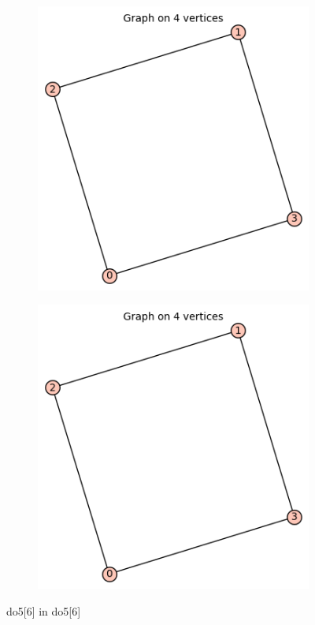 \documentclass[12pt, a4paper]{article}
\begin{document}
\begin{center}
\begin{figure}
\centering
\begin{subfigure}{0.5\textwidth}
  \centering
  \includegraphics[width=0.6\linewidth]{do5[6]}
\end{subfigure}%
\begin{subfigure}{0.5\textwidth}
  \centering
  \includegraphics[width=0.6\linewidth]{do5[6]}
\end{subfigure}
\caption{do5[6] in do5[6]}
\label{fig:test}
\end{figure}


\end{center}
\end{document}
